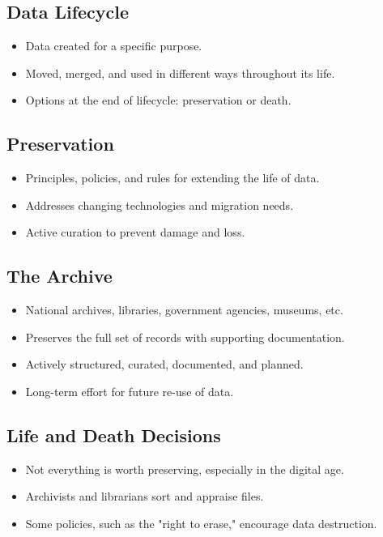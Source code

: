 \documentclass{article}
\begin{document}
\subsection*{Data Lifecycle}
\begin{itemize}
  \item Data created for a specific purpose.
  \item Moved, merged, and used in different ways throughout its life.
  \item Options at the end of lifecycle: preservation or death.
\end{itemize}

\subsection*{Preservation}
\begin{itemize}
  \item Principles, policies, and rules for extending the life of data.
  \item Addresses changing technologies and migration needs.
  \item Active curation to prevent damage and loss.
\end{itemize}

\subsection*{The Archive}
\begin{itemize}
  \item National archives, libraries, government agencies, museums, etc.
  \item Preserves the full set of records with supporting documentation.
  \item Actively structured, curated, documented, and planned.
  \item Long-term effort for future re-use of data.
\end{itemize}

\subsection*{Life and Death Decisions}
\begin{itemize}
  \item Not everything is worth preserving, especially in the digital age.
  \item Archivists and librarians sort and appraise files.
  \item Some policies, such as the "right to erase," encourage data destruction.
\end{itemize}
\end{document}
